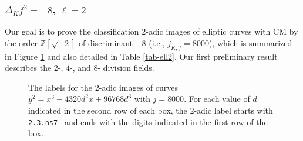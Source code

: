 \documentclass[11pt]{amsart}
\theoremstyle{definition}
\newcommand{\Q}{\mathbb Q}
\newcommand{\Z}{\mathbb Z}
\begin{document}
\subsubsection{$\Delta_Kf^2=-8$, $\ell = 2$}\label{sec-8ell2} Our goal is to prove the classification $2$-adic images of elliptic curves with CM by the order $\Z[\sqrt{-2}]$ of discriminant $-8$ (i.e., $j_{K,f}=8000$), which is summarized in Figure \ref{fig-8ell2} and also detailed in Table \ref{tab-ell2}. Our first preliminary result describes the $2$-, $4$-, and $8$- division fields.

\begin{figure}[ht]
\caption{The labels for the $2$-adic images of curves $y^2=x^3 - 4320d^2 x + 96768d^3$ with $j=8000$. For each value of $d$ indicated in the second row of each box, the $2$-adic label starts with \texttt{2.3.ns7-} and ends with the digits indicated in the first row of the box.}\label{fig-8ell2}
\end{figure}

\end{document}

